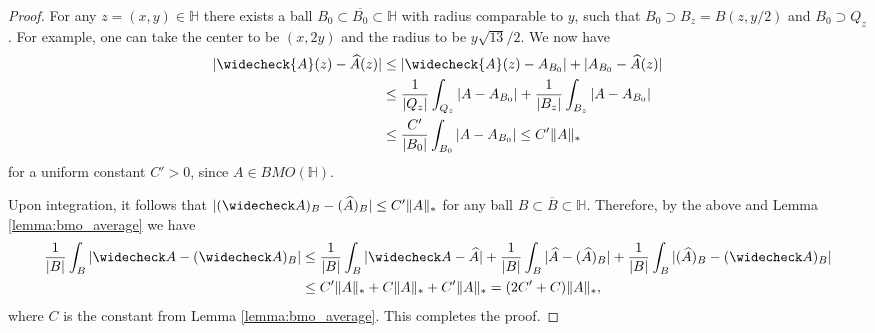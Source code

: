 \documentclass{amsart}
\theoremstyle{plain}
\theoremstyle{definition}
\theoremstyle{remark}
\numberwithin{equation}{section}
\numberwithin{theorem}{section}
\numberwithin{conjecture}{section}
\newcommand{\br}{\overline}
\newcommand{\1}{\mathbf 1}
\newcommand{\UHP}{\mathbb H}
\begin{document}
\begin{proof}
For any $z=(x,y)\in \UHP$ there exists a ball $B_0\subset \br {B_0}\subset \UHP$ with radius comparable to $y$, such that $B_0\supset B_z=B(z,y/2)$ and $B_0\supset Q_z$. For example, one can take the center to be $(x,2y)$ and the radius to be $y\sqrt{13}/2$.  We now have
\begin{align*}
|\widecheck{A}(z) -\widehat{A}(z)| &\leq |\widecheck{A}(z)-A_{B_0}| +|A_{B_0}-\widehat A(z)| \\
&\leq \frac{1}{|Q_z|} \int_{Q_z} |A-A_{B_0}| + \frac{1}{|B_z|} \int_{B_z} |A-A_{B_0}|\\
&\leq \frac{C'}{|B_0|} \int_{B_0} |A-A_{B_0}| \leq C'\|A\|_*
\end{align*}
for a uniform constant $C'>0$, since $A\in BMO(\UHP)$. 

Upon integration, it follows that $|(\widecheck A)_B- (\widehat A)_B| \leq C'\|A\|_*$ for any ball $B\subset \br B\subset \UHP$. Therefore, by the above and Lemma \ref{lemma:bmo_average} we have
\begin{align*}
\frac{1}{|B|}\int_B |\widecheck A- (\widecheck A)_B| &\leq \frac{1}{|B|}\int_B |\widecheck A- \widehat{A}|+\frac{1}{|B|}\int_B |\widehat A- (\widehat A)_B|+\frac{1}{|B|}\int_B |(\widehat A)_B- (\widecheck A)_B|\\
&\leq C'\|A\|_* +C\|A\|_* +C'\|A\|_* =(2C'+C)\|A\|_*,
\end{align*}
where $C$ is the constant from Lemma \ref{lemma:bmo_average}. This completes the proof.
\end{proof}
\end{document}
